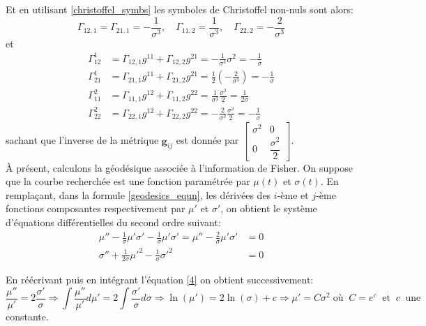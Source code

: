 \documentclass[11pt,french]{article}
\begin{document}
Et en utilisant \eqref{christoffel_symbs} les symboles de Christoffel non-nuls sont alors:
\begin{equation*}
    \Gamma_{12,1}=\Gamma_{21,1}=-\frac{1}{\sigma^3},\quad \Gamma_{11,2}=\frac{1}{\sigma^3}, \quad \Gamma_{22,2}=-\frac{2}{\sigma^3}
\end{equation*}
et 
\begin{align*}
    \Gamma_{12}^1&=\Gamma_{12,1}g^{11}+\Gamma_{12,2}g^{21}=-\frac{1}{\sigma^3}\sigma^2=-\frac{1}{\sigma}\\
    \Gamma_{21}^1&=\Gamma_{21,1}g^{11}+\Gamma_{21,2}g^{21}=\frac{1}{2}\left(-\frac{2}{\sigma^3}\right)=-\frac{1}{\sigma}\\
    \Gamma_{11}^2&=\Gamma_{11,1}g^{12}+\Gamma_{11,2}g^{22}=\frac{1}{\sigma^3}\frac{\sigma^2}{2}=\frac{1}{2\sigma}\\
    \Gamma_{22}^2&=\Gamma_{22,1}g^{12}+\Gamma_{22,2}g^{22}=-\frac{2}{\sigma^3}\frac{\sigma^2}{2}=-\frac{1}{\sigma}
\end{align*}
sachant que l'inverse de la métrique $\mathbf{g}_{ij}$ est donnée par $\begin{bmatrix}
    \sigma^2 & 0
    \\[5pt]
    0 & \dfrac{\sigma^2}{2}
    \end{bmatrix}$.\\
    
À présent, calculons la géodésique associée à l'information de Fisher. On suppose que la courbe recherchée est une fonction paramétrée par $\mu(t)$ et $\sigma(t)$. En remplaçant, dans la formule \eqref{geodesics_equn}, les dérivées des $i$-ème et $j$-ème fonctions composantes respectivement par $\mu'$ et $\sigma'$, on obtient le système d'équations différentielles du second ordre suivant:
\begin{align}
    \mu''-\frac{1}{\sigma}\mu'\sigma'-\frac{1}{\sigma}\mu'\sigma'=\mu''-\frac{2}{\sigma}\mu'\sigma'&=0\label{4}\\
    \sigma''+\frac{1}{2\sigma}\mu'^2-\frac{1}{\sigma}\sigma'^2&=0\label{5}
\end{align}

En réécrivant puis en intégrant l'équation \eqref{4} on obtient successivement:
\begin{equation*}
    \frac{\mu''}{\mu'}=2\frac{\sigma'}{\sigma}\Longrightarrow\int\frac{\mu''}{\mu'}d\mu'=2\int\frac{\sigma'}{\sigma}d\sigma\Longrightarrow\ln(\mu')=2\ln(\sigma)+c\Longrightarrow\mu'=C\sigma^2\;\text{où}\;\; C=e^c\;\;\text{et}\;\;c\;\;\text{une}  
\end{equation*}
constante.
\end{document}
